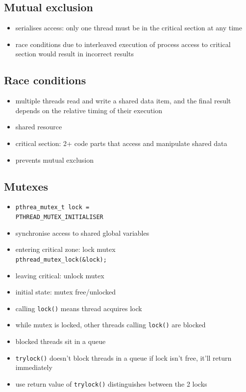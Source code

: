 \documentclass[10pt, multicolumn, a4paper]{article}
\begin{document}
\begin{multicols}{2}
	\subsection*{Mutual exclusion}
	\begin{itemize}
	\item serialises access: only one thread must be in the critical section at any time
	\item race conditions due to interleaved execution of process access to critical section would result in incorrect results
	\end{itemize}
	\subsection*{Race conditions}
	\begin{itemize}
	\item multiple threads read and write a shared data item, and the final result depends on the relative timing of their execution
	\item shared resource
	\item critical section: 2+ code parts that access and manipulate shared data
	\item prevents mutual exclusion
	\end{itemize}
	\subsection*{Mutexes}
	\begin{itemize}
	\item \verb|pthrea_mutex_t lock =| \\ \verb|PTHREAD_MUTEX_INITIALISER|
	\item synchronise access to shared global variables
	\item entering critical zone: lock mutex \\ \verb|pthread_mutex_lock(&lock);|
	\item leaving critical: unlock mutex
	\item initial state: mutex free/unlocked
	\item calling \verb|lock()| means thread acquires lock 
	\item while mutex is locked, other threads calling \verb|lock()| are blocked
	\item blocked threads sit in a queue
	\item \verb|trylock()| doesn't block threads in a queue if lock isn't free, it'll return immediately
	\item use return value of \verb|trylock()| distinguishes between the 2 locks
	\end{itemize}

\end{multicols}
\end{document}
